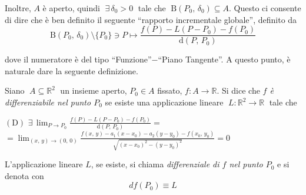 Inoltre, $A$ è aperto, quindi $\; \exists \, \delta_0 > 0 \;$ tale che $\; \mathrm{B}(P_0,\,\delta_0) \subseteq A$. Questo ci consente di dire che è ben definito il seguente ``rapporto incrementale globale'', definito da
$$
\mathrm{B}(P_0,\,\delta_0) \setminus \lbrace P_0 \rbrace \ni P \longmapsto
\frac{f(P)-L(P-P_0)-f(P_0)}{\mathrm{d}(P,\,P_0)}
$$

dove il numeratore è del tipo ``Funzione''$-$``Piano Tangente''. A questo punto, è naturale dare la seguente definizione.

\begin{definition}
Siano $\; A \subseteq \mathbb{R}^2 \;$ un insieme aperto, $P_0 \in A$ fissato, $f:A \longrightarrow \mathbb{R}$. Si dice che \emph{$f$ è differenziabile nel punto $P_0$} se esiste una applicazione lineare $\; L: \mathbb{R}^2 \longrightarrow \mathbb{R} \;$ tale che

\begin{center}
$\mathrm{(D)}$
\hfill
$\displaystyle
\exists \, \lim_{P \rightarrow P_0} \frac{f(P)-L(P-P_0)-f(P_0)}{\mathrm{d}(P,\,P_0)} =$
\hfill \null \\
\vskip 16pt
\hfill
$\displaystyle
=\lim_{(x,\,y) \rightarrow (0,\,0)} \frac{f(x,\,y) - a_1(x-x_0) - a_2(y-y_0) - f(x_0,\,y_0)}{\sqrt{(x-x_0)^2 - (y-y_0)^2}} =
0
$
\hfill \null
\end{center}

L'applicazione lineare $L$, se esiste, si chiama \emph{differenziale di $f$ nel punto $P_0$} e si denota con
$$df(P_0) \equiv L$$
\end{definition}

